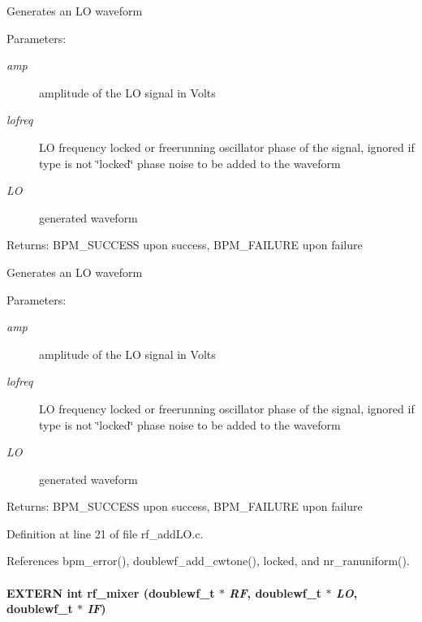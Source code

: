 Generates an LO waveform \begin{Desc}
\item[Parameters:]
\begin{description}
\item[{\em amp}]amplitude of the LO signal in Volts \item[{\em lofreq}]LO frequency  locked or freerunning oscillator  phase of the signal, ignored if type is not \char`\"{}locked\char`\"{}  phase noise to be added to the waveform \item[{\em LO}]generated waveform \end{description}
\end{Desc}
\begin{Desc}
\item[Returns:]BPM\_\-SUCCESS upon success, BPM\_\-FAILURE upon failure\end{Desc}
Generates an LO waveform \begin{Desc}
\item[Parameters:]
\begin{description}
\item[{\em amp}]amplitude of the LO signal in Volts \item[{\em lofreq}]LO frequency  locked or freerunning oscillator  phase of the signal, ignored if type is not \char`\"{}locked\char`\"{}  phase noise to be added to the waveform \item[{\em LO}]generated waveform \end{description}
\end{Desc}
\begin{Desc}
\item[Returns:]BPM\_\-SUCCESS upon success, BPM\_\-FAILURE upon failure \end{Desc}


Definition at line 21 of file rf\_\-addLO.c.

References bpm\_\-error(), doublewf\_\-add\_\-cwtone(), locked, and nr\_\-ranuniform().
\paragraph[rf\_\-mixer]{\setlength{\rightskip}{0pt plus 5cm}EXTERN int rf\_\-mixer ({\bf doublewf\_\-t} $\ast$ {\em RF}, \/  {\bf doublewf\_\-t} $\ast$ {\em LO}, \/  {\bf doublewf\_\-t} $\ast$ {\em IF})}\hfill\label{group__rf_g3fa83d362967cd7bf18f74528579278a}


